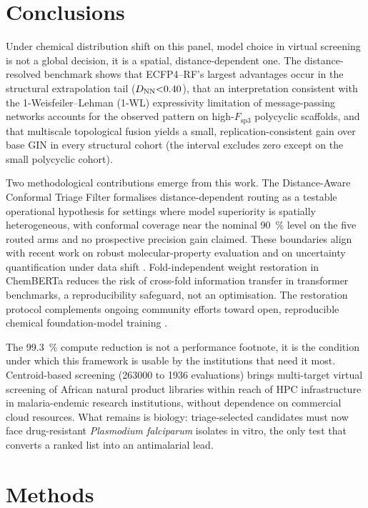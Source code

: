 \documentclass[11pt,a4paper]{article}
\begin{document}
\section{Conclusions}

Under chemical distribution shift on this panel, model choice in virtual screening is not a global decision, it is a spatial, distance-dependent one. The distance-resolved benchmark shows that ECFP4--RF's largest advantages occur in the structural extrapolation tail ($D_{\text{NN}}\num{<0.40}$), that an interpretation consistent with the 1-Weisfeiler--Lehman (1-WL) expressivity limitation of message-passing networks accounts for the observed pattern on high-$F_{\mathrm{sp3}}$ polycyclic scaffolds, and that multiscale topological fusion yields a small, replication-consistent gain over base GIN in every structural cohort (the interval excludes zero except on the small polycyclic cohort).

Two methodological contributions emerge from this work. The Distance-Aware Conformal Triage Filter formalises distance-dependent routing as a testable operational hypothesis for settings where model superiority is spatially heterogeneous, with conformal coverage near the nominal \qty{90}{\percent} level on the five routed arms and no prospective precision gain claimed. These boundaries align with recent work on robust molecular-property evaluation \citep{sheridan2024realworld,fooladi2025ood} and on uncertainty quantification under data shift \citep{unique2026uq}. Fold-independent weight restoration in ChemBERTa reduces the risk of cross-fold information transfer in transformer benchmarks, a reproducibility safeguard, not an optimisation. The restoration protocol complements ongoing community efforts toward open, reproducible chemical foundation-model training \citep{chemberta3_2026}.

The \qty{99.3}{\percent} compute reduction is not a performance footnote, it is the condition under which this framework is usable by the institutions that need it most. Centroid-based screening (\num{263000} to \num{1936} evaluations) brings multi-target virtual screening of African natural product libraries within reach of HPC infrastructure in malaria-endemic research institutions, without dependence on commercial cloud resources. What remains is biology: triage-selected candidates must now face drug-resistant \emph{Plasmodium falciparum} isolates in vitro, the only test that converts a ranked list into an antimalarial lead.

\section{Methods}
\end{document}
